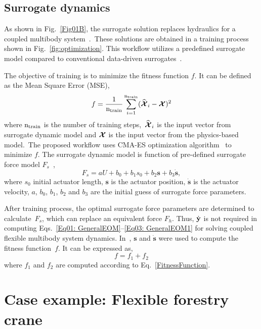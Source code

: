 \subsection{Surrogate dynamics}
As shown in Fig.~\ref{Fig01B}, the surrogate solution replaces hydraulics for a coupled multibody system~\cite{khadim2024simulation}.~These solutions are obtained in a training process shown in Fig.~\ref{fig:optimization}. This workflow utilizes a predefined surrogate model compared to conventional data-driven surrogates~\cite{han2024data,manzl2024slide,khadim2025real}. 

The objective of training is to minimize the fitness function ${f}$. It can be defined as the Mean Square Error (MSE),
\begin{equation}
 \label{FitnessFunction}
     f = \frac{1}{{{\mathrm{n}}_{\mathrm{train}}}} \sum_{i=1}^{{\mathrm{n}}_{\mathrm{train}}} ({\widehat{\bm{\mathcal{ X}}}}_{i} - \bm{\mathcal{ X}})^2
\end{equation}
where ${\mathrm{n}}_{\mathrm{train}}$ is the number of training steps,~${\widehat{\bm{\mathcal{ X}}}}_{i}$ is the input vector from surrogate dynamic model and ${{\bm{\mathcal{ X}}}}$ is the input vector from the physics-based model.~The proposed workflow uses CMA-ES optimization algorithm~\cite{hansen2003reducing} to minimize $f$. The surrogate dynamic model is function of pre-defined surrogate force model ${F}_{s}$~\cite{khadim2024simulation}, 
\begin{equation} \label{Surrogate}
{F}_{s}  =  aU + b_0 + b_1s_0 + b_2{\mathbf{s}} + b_3\dot{{\mathbf{s}}},
\end{equation}
where $s_0$ initial actuator length, ${\mathbf{s}}$ is the actuator position, $\dot{{\mathbf{s}}}$ is the actuator velocity, $a$, $b_0$, $b_1$, $b_2$ and $b_3$ are the initial guess of surrogate force parameters. 

After training process, the optimal surrogate force parameters are determined to calculate~$F_s$, which can replace an equivalent force $F_h$. Thus, $\dot{\mathbf{y}}$ is not required in computing Eqs.~\eqref{Eq01: GeneralEOM}--\eqref{Eq03: GeneralEOM1} for solving coupled flexible multibody system dynamics. In~\cite{khadim2024simulation}, ${\mathbf{s}}$ and $\dot{{\mathbf{s}}}$ were used to compute the fitness function~$f$. It can be expressed as, 
\begin{equation}
    f = f_1+f_2
\end{equation}
where $f_1$ and $f_2$ are computed according to Eq.~\eqref{FitnessFunction}.
\section{Case example: Flexible forestry crane}

